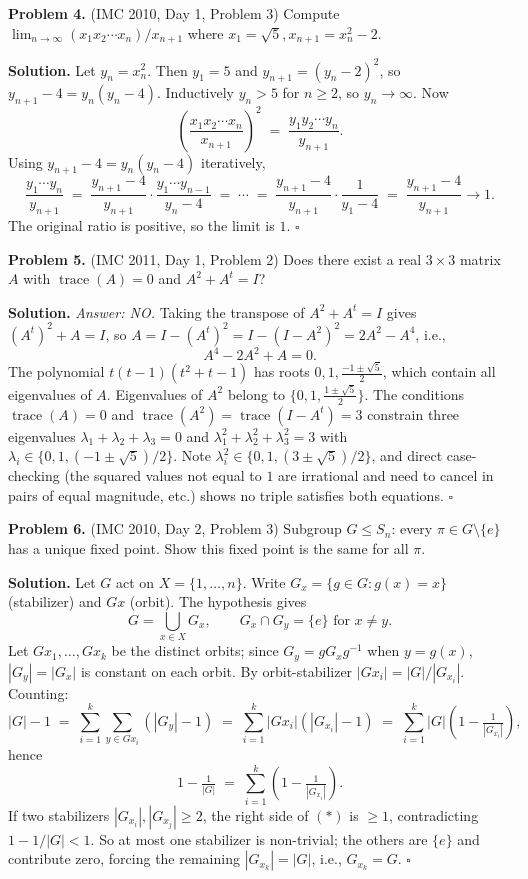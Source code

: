 \documentclass{article}
\newcommand{\tr}{\operatorname{trace}}
\begin{document}
\bigskip
\textbf{Problem 4.} (IMC 2010, Day 1, Problem 3)
Compute \( \lim_{n \to \infty} (x_1 x_2 \cdots x_n)/x_{n+1} \) where \( x_1 = \sqrt{5}, x_{n+1} = x_n^2 - 2 \).

\textbf{Solution.}
Let \( y_n = x_n^2 \). Then \( y_1 = 5 \) and \( y_{n+1} = (y_n - 2)^2 \), so \( y_{n+1} - 4 = y_n(y_n - 4) \). Inductively \( y_n > 5 \) for \( n \geq 2 \), so \( y_n \to \infty \). Now
\[
\left( \frac{x_1 x_2 \cdots x_n}{x_{n+1}} \right)^2 \;=\; \frac{y_1 y_2 \cdots y_n}{y_{n+1}}.
\]
Using \( y_{n+1} - 4 = y_n(y_n - 4) \) iteratively,
\[
\frac{y_1 \cdots y_n}{y_{n+1}} \;=\; \frac{y_{n+1} - 4}{y_{n+1}} \cdot \frac{y_1 \cdots y_{n-1}}{y_n - 4} \;=\; \cdots \;=\; \frac{y_{n+1} - 4}{y_{n+1}} \cdot \frac{1}{y_1 - 4} \;=\; \frac{y_{n+1} - 4}{y_{n+1}} \to 1.
\]
The original ratio is positive, so the limit is \( 1 \). \hfill\(\square\)

\bigskip
\textbf{Problem 5.} (IMC 2011, Day 1, Problem 2)
Does there exist a real \( 3 \times 3 \) matrix \( A \) with \( \tr(A) = 0 \) and \( A^2 + A^t = I \)?

\textbf{Solution.} \emph{Answer: NO.}
Taking the transpose of \( A^2 + A^t = I \) gives \( (A^t)^2 + A = I \), so \( A = I - (A^t)^2 = I - (I - A^2)^2 = 2A^2 - A^4 \), i.e.,
\[
A^4 - 2A^2 + A = 0.
\]
The polynomial \( t(t-1)(t^2 + t - 1) \) has roots \( 0, 1, \tfrac{-1 \pm \sqrt{5}}{2} \), which contain all eigenvalues of \( A \). Eigenvalues of \( A^2 \) belong to \( \{0, 1, \tfrac{1 \pm \sqrt{5}}{2}\} \). The conditions \( \tr(A) = 0 \) and \( \tr(A^2) = \tr(I - A^t) = 3 \) constrain three eigenvalues \( \lambda_1 + \lambda_2 + \lambda_3 = 0 \) and \( \lambda_1^2 + \lambda_2^2 + \lambda_3^2 = 3 \) with \( \lambda_i \in \{0, 1, (-1 \pm \sqrt 5)/2\} \). Note \( \lambda_i^2 \in \{0, 1, (3 \pm \sqrt 5)/2\} \), and direct case-checking (the squared values not equal to \( 1 \) are irrational and need to cancel in pairs of equal magnitude, etc.) shows no triple satisfies both equations. \hfill\(\square\)

\bigskip
\textbf{Problem 6.} (IMC 2010, Day 2, Problem 3)
Subgroup \( G \leq S_n \): every \( \pi \in G \setminus \{e\} \) has a unique fixed point. Show this fixed point is the same for all \( \pi \).

\textbf{Solution.}
Let \( G \) act on \( X = \{1, \ldots, n\} \). Write \( G_x = \{ g \in G : g(x) = x \} \) (stabilizer) and \( Gx \) (orbit). The hypothesis gives
\[
G = \bigcup_{x \in X} G_x, \qquad G_x \cap G_y = \{e\} \text{ for } x \neq y.
\]
Let \( Gx_1, \ldots, Gx_k \) be the distinct orbits; since \( G_y = g G_x g^{-1} \) when \( y = g(x) \), \( |G_y| = |G_x| \) is constant on each orbit. By orbit-stabilizer \( |Gx_i| = |G|/|G_{x_i}| \). Counting:
\[
|G| - 1 \;=\; \sum_{i=1}^k \sum_{y \in Gx_i} (|G_y| - 1) \;=\; \sum_{i=1}^k |Gx_i|(|G_{x_i}| - 1) \;=\; \sum_{i=1}^k |G|\left(1 - \tfrac{1}{|G_{x_i}|}\right),
\]
hence
\[
1 - \tfrac{1}{|G|} \;=\; \sum_{i=1}^k \left(1 - \tfrac{1}{|G_{x_i}|}\right). \tag{*}
\]
If two stabilizers \( |G_{x_i}|, |G_{x_j}| \geq 2 \), the right side of \( (*) \) is \( \geq 1 \), contradicting \( 1 - 1/|G| < 1 \). So at most one stabilizer is non-trivial; the others are \( \{e\} \) and contribute zero, forcing the remaining \( |G_{x_k}| = |G| \), i.e., \( G_{x_k} = G \). \hfill\(\square\)
\end{document}
